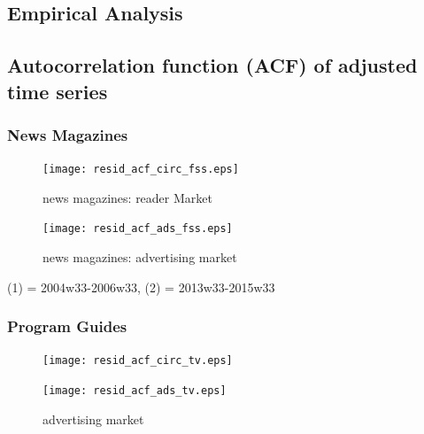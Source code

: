 \documentclass[12pt,a4paper,notitlepage]{article}
\begin{document}
\printbibliography

\begin{appendices}












\section{Empirical Analysis}

\subsection{Autocorrelation function (ACF) of adjusted time series}

\subsubsection{News Magazines}\label{app_acf_fss}

\begin{figure}[H]
\caption{news magazines: reader Market}
	\centering
	\texttt{[image: resid\_acf\_circ\_fss.eps]}
\end{figure}

\begin{figure}[H]
\caption{news magazines: advertising market}
	\centering
	\texttt{[image: resid\_acf\_ads\_fss.eps]}
\end{figure}

(1) = 2004w33-2006w33, (2) = 2013w33-2015w33

\subsubsection{Program Guides}\label{appendix_sum_tv}

\begin{figure}[H]
\begin{minipage}{.5\textwidth}
	\centering
	\texttt{[image: resid\_acf\_circ\_tv.eps]}
\end{minipage}
\hfil
\begin{minipage}{.5\textwidth}
	\centering
	\caption{advertising market}
	\texttt{[image: resid\_acf\_ads\_tv.eps]}
\end{minipage}
\label{resid_acf_tv}
\end{figure}


\end{appendices}
\end{document}
